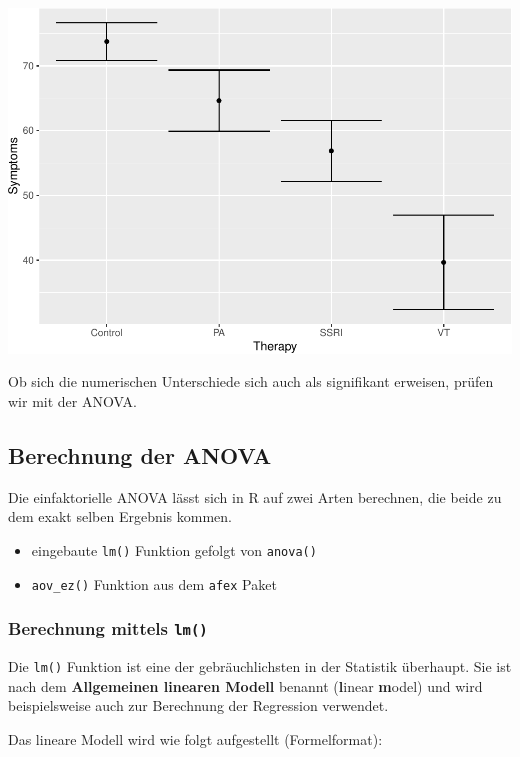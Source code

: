 \documentclass[
]{book}
\providecommand{\tightlist}{%
  \setlength{\itemsep}{0pt}\setlength{\parskip}{0pt}}
\begin{document}
\includegraphics{CFH_R_bookdown_files/figure-latex/unnamed-chunk-304-1.pdf}

Ob sich die numerischen Unterschiede sich auch als signifikant erweisen, prüfen wir mit der ANOVA.

\hypertarget{berechnung-der-anova}{%
\subsection{Berechnung der ANOVA}\label{berechnung-der-anova}}

Die einfaktorielle ANOVA lässt sich in R auf zwei Arten berechnen, die beide zu dem exakt selben Ergebnis kommen.

\begin{itemize}
\tightlist
\item
  eingebaute \texttt{lm()} Funktion gefolgt von \texttt{anova()}
\item
  \texttt{aov\_ez()} Funktion aus dem \texttt{afex} Paket
\end{itemize}

\hypertarget{berechnung-mittels-lm}{%
\subsubsection{\texorpdfstring{Berechnung mittels \texttt{lm()}}{Berechnung mittels lm()}}\label{berechnung-mittels-lm}}

Die \texttt{lm()} Funktion ist eine der gebräuchlichsten in der Statistik überhaupt. Sie ist nach dem \textbf{Allgemeinen linearen Modell} benannt (\textbf{l}inear \textbf{m}odel) und wird beispielsweise auch zur Berechnung der Regression verwendet.

Das lineare Modell wird wie folgt aufgestellt (Formelformat):
\end{document}
